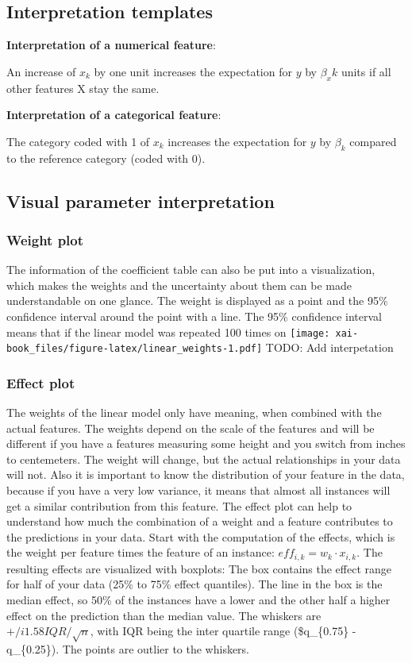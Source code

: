 \documentclass[12pt,]{krantz}
\theoremstyle{definition}
\theoremstyle{definition}
\theoremstyle{definition}
\theoremstyle{remark}
\begin{document}
\subsection{Interpretation templates}\label{interpretation-templates}

\textbf{Interpretation of a numerical feature}:

An increase of \(x_{k}\) by one unit increases the expectation for \(y\)
by \(\beta_x{k}\) units if all other features X stay the same.

\textbf{Interpretation of a categorical feature}:

The category coded with 1 of \(x_{k}\) increases the expectation for
\(y\) by \(\beta_{k}\) compared to the reference category (coded with
0).

\subsection{Visual parameter
interpretation}\label{visual-parameter-interpretation}

\subsubsection{Weight plot}\label{weight-plot}

The information of the coefficient table can also be put into a
visualization, which makes the weights and the uncertainty about them
can be made understandable on one glance. The weight is displayed as a
point and the 95\% confidence interval around the point with a line. The
95\% confidence interval means that if the linear model was repeated 100
times on
\texttt{[image: xai-book\_files/figure-latex/linear\_weights-1.pdf]} TODO:
Add interpetation

\subsubsection{Effect plot}\label{effect-plot}

The weights of the linear model only have meaning, when combined with
the actual features. The weights depend on the scale of the features and
will be different if you have a features measuring some height and you
switch from inches to centemeters. The weight will change, but the
actual relationships in your data will not. Also it is important to know
the distribution of your feature in the data, because if you have a very
low variance, it means that almost all instances will get a similar
contribution from this feature. The effect plot can help to understand
how much the combination of a weight and a feature contributes to the
predictions in your data. Start with the computation of the effects,
which is the weight per feature times the feature of an instance:
\(eff_{i,k} = w_{k} \cdot x_{i,k}\). The resulting effects are
visualized with boxplots: The box contains the effect range for half of
your data (25\% to 75\% effect quantiles). The line in the box is the
median effect, so 50\% of the instances have a lower and the other half
a higher effect on the prediction than the median value. The whiskers
are \(+/i 1.58 IQR / \sqrt{n}\), with IQR being the inter quartile range
(\$q\_\{0.75\} - q\_\{0.25\}). The points are outlier to the whiskers.
\end{document}
